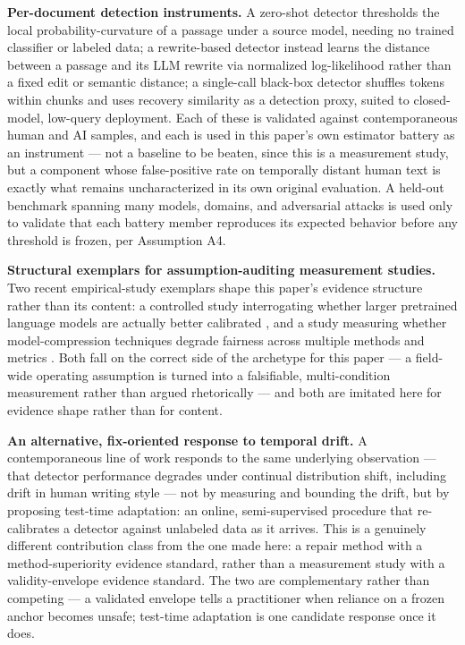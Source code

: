 \documentclass[conference]{IEEEtran}
\begin{document}
\textbf{Per-document detection instruments.} A zero-shot detector \cite{DetectGPT} thresholds the local probability-curvature of a passage under a source model, needing no trained classifier or labeled data; a rewrite-based detector \cite{LearnToDistance} instead learns the distance between a passage and its LLM rewrite via normalized log-likelihood rather than a fixed edit or semantic distance; a single-call black-box detector \cite{DnR} shuffles tokens within chunks and uses recovery similarity as a detection proxy, suited to closed-model, low-query deployment. Each of these is validated against contemporaneous human and AI samples, and each is used in this paper's own estimator battery as an instrument --- not a baseline to be beaten, since this is a measurement study, but a component whose false-positive rate on temporally distant human text is exactly what remains uncharacterized in its own original evaluation. A held-out benchmark spanning many models, domains, and adversarial attacks \cite{RAID} is used only to validate that each battery member reproduces its expected behavior before any threshold is frozen, per Assumption A4.

\textbf{Structural exemplars for assumption-auditing measurement studies.} Two recent empirical-study exemplars shape this paper's evidence structure rather than its content: a controlled study interrogating whether larger pretrained language models are actually better calibrated \cite{ACloseLookInto}, and a study measuring whether model-compression techniques degrade fairness across multiple methods and metrics \cite{AComparativeStudyOn}. Both fall on the correct side of the archetype for this paper --- a field-wide operating assumption is turned into a falsifiable, multi-condition measurement rather than argued rhetorically --- and both are imitated here for evidence shape rather than for content.

\textbf{An alternative, fix-oriented response to temporal drift.} A contemporaneous line of work \cite{MovingTargetTTA} responds to the same underlying observation --- that detector performance degrades under continual distribution shift, including drift in human writing style --- not by measuring and bounding the drift, but by proposing test-time adaptation: an online, semi-supervised procedure that re-calibrates a detector against unlabeled data as it arrives. This is a genuinely different contribution class from the one made here: a repair method with a method-superiority evidence standard, rather than a measurement study with a validity-envelope evidence standard. The two are complementary rather than competing --- a validated envelope tells a practitioner when reliance on a frozen anchor becomes unsafe; test-time adaptation is one candidate response once it does.
\end{document}
